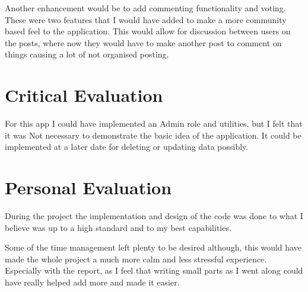 \documentclass[10pt, a4paper]{article}
\begin{document}
	Another enhancement would be to add commenting functionality and voting. These were two features that I would have added to make a more community based feel to the application. This would allow for discussion between users on the posts, where now they would have to make another post to comment on things causing a lot of not organised posting.
	
	
	\section{Critical Evaluation}
	For this app I could have implemented an Admin role and utilities, but I felt that it was Not necessary to demonstrate the basic idea of the application. It could be implemented at a later date for deleting or updating data possibly.
	
	\section{Personal Evaluation}
	During the project the implementation and design of the code was done to what I believe was up to a high standard and to my best capabilities.
	
	Some of the time management left plenty to be desired although, this would have made the whole project a much more calm and less stressful experience. Especially with the report, as I feel that writing small parts as I went along could have really helped add more and made it easier.
\end{document}
